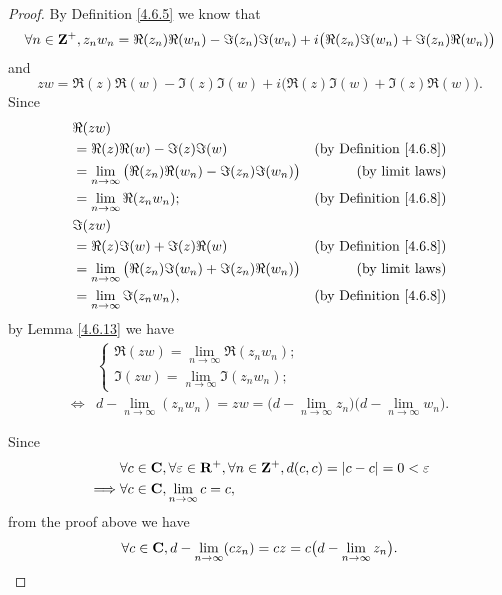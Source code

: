 \begin{proof}
    By Definition \ref{4.6.5} we know that
    \[
        \forall n \in \mathbf{Z}^+, z_n w_n = \Re(z_n) \Re(w_n) - \Im(z_n) \Im(w_n) + i \big(\Re(z_n) \Im(w_n) + \Im(z_n) \Re(w_n)\big)
    \]
    and
    \[
        z w = \Re(z) \Re(w) - \Im(z) \Im(w) + i \big(\Re(z) \Im(w) + \Im(z) \Re(w)\big).
    \]
    Since
    \begin{align*}
         & \Re(zw)                                                                                                    \\
         & = \Re(z) \Re(w) - \Im(z) \Im(w)                                       & \text{(by Definition \ref{4.6.8})} \\
         & = \lim_{n \to \infty} \big(\Re(z_n) \Re(w_n) - \Im(z_n) \Im(w_n)\big) & \text{(by limit laws)}             \\
         & = \lim_{n \to \infty} \Re(z_n w_n);                                   & \text{(by Definition \ref{4.6.8})} \\
         & \Im(zw)                                                                                                    \\
         & = \Re(z) \Im(w) + \Im(z) \Re(w)                                       & \text{(by Definition \ref{4.6.8})} \\
         & = \lim_{n \to \infty} \big(\Re(z_n) \Im(w_n) + \Im(z_n) \Re(w_n)\big) & \text{(by limit laws)}             \\
         & = \lim_{n \to \infty} \Im(z_n w_n),                                   & \text{(by Definition \ref{4.6.8})}
    \end{align*}
    by Lemma \ref{4.6.13} we have
    \begin{align*}
             & \begin{cases}
                   \Re(zw) = \lim_{n \to \infty} \Re(z_n w_n); \\
                   \Im(zw) = \lim_{n \to \infty} \Im(z_n w_n);
               \end{cases}                                                                           \\
        \iff & d - \lim_{n \to \infty} (z_n w_n) = zw = \big(d - \lim_{n \to \infty} z_n\big) \big(d - \lim_{n \to \infty} w_n\big).
    \end{align*}

    Since
    \begin{align*}
                 & \forall c \in \mathbf{C}, \forall \varepsilon \in \mathbf{R}^+, \forall n \in \mathbf{Z}^+, d(c, c) = \left\lvert c - c\right\rvert = 0 < \varepsilon \\
        \implies & \forall c \in \mathbf{C}, \lim_{n \to \infty} c = c,
    \end{align*}
    from the proof above we have
    \[
        \forall c \in \mathbf{C}, d - \lim_{n \to \infty} (c z_n) = cz = c \big(d - \lim_{n \to \infty} z_n\big).
    \]


\end{proof}
